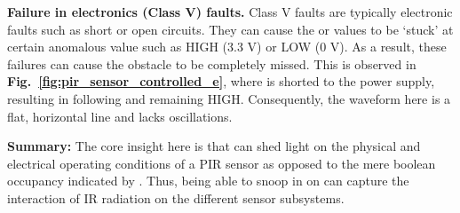 \textbf{Failure in electronics (Class V) faults.} Class V faults are typically electronic faults such as short or open circuits. They can cause the \aout or \cout values to be `stuck' at certain anomalous value such as HIGH (3.3 V) or LOW (0 V). As a result, these failures can cause the obstacle to be completely missed. This is observed in {\bfseries Fig.~\ref{fig:pir_sensor_controlled_e}}, where \aout is shorted to the power supply, resulting in \cout following \aout and remaining HIGH. Consequently, the \aout waveform here is a flat, horizontal line and lacks oscillations. 

\noindent \textbf{Summary:} The core insight here is that \aout can shed light on the physical and electrical operating conditions of a PIR sensor as opposed to the mere boolean occupancy indicated by \cout. Thus, being able to snoop in on \aout can capture the interaction of IR radiation on the different sensor subsystems. 


